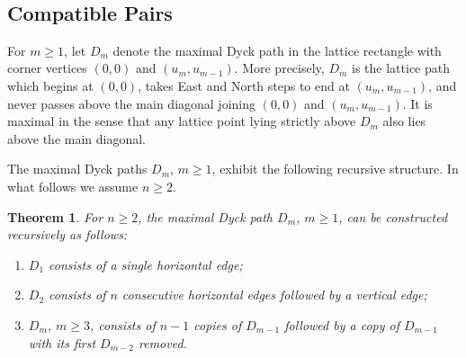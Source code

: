 \documentclass{amsart}
\newtheorem{theorem}{Theorem}[section]
\numberwithin{equation}{section}
\begin{document}
\\




\subsection{Compatible Pairs}
For $m\ge1$, let $D_m$ denote the maximal Dyck path in the lattice rectangle with corner vertices $(0,0)$ and $(u_m,u_{m-1})$.  
More precisely, $D_m$ is the lattice path which begins at $(0,0)$, takes East and North steps to end at $(u_m,u_{m-1})$, and never passes above the main diagonal joining $(0,0)$ and $(u_m,u_{m-1})$.  
It is maximal in the sense that any lattice point lying strictly above $D_m$ also lies above the main diagonal.  

The maximal Dyck paths $D_m$, $m\ge1$, exhibit the following recursive structure.
In what follows we assume $n\ge2$.
\begin{theorem}
  \cite[Corollary 2.4]{rupel}
  \label{th:dyck path recursion}
  For $n\ge2$, the maximal Dyck path $D_m$, $m\ge1$, can be constructed recursively as follows:
  \begin{enumerate}
    \item $D_1$ consists of a single horizontal edge;
    \item $D_2$ consists of $n$ consecutive horizontal edges followed by a vertical edge;
    \item $D_m$, $m\ge3$, consists of $n-1$ copies of $D_{m-1}$ followed by a copy of $D_{m-1}$ with its first $D_{m-2}$ removed.
  \end{enumerate}
\end{theorem}
\end{document}
